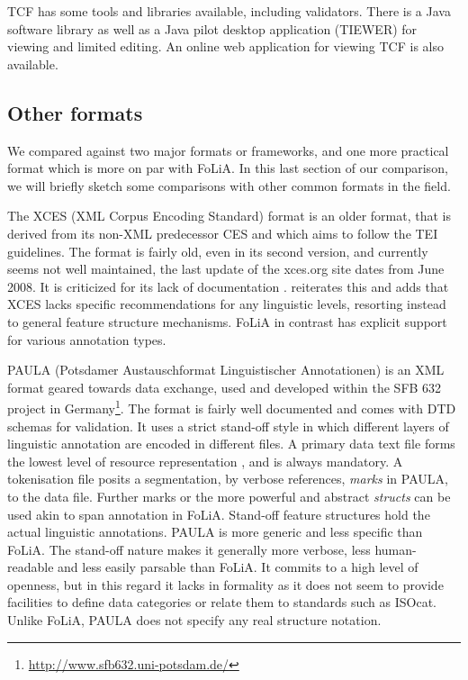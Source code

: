 \documentclass[a4paper,10pt,twoside]{article}
\begin{document}
TCF has some tools and libraries available, including validators. There is a
Java software library as well as a Java pilot desktop application (TIEWER) for
viewing and limited editing. An online web application for viewing TCF is also
available.


\subsection{Other formats}

We compared against two major formats or frameworks, and one more practical format which is
more on par with FoLiA. In this last section of our comparison, we will briefly
sketch some comparisons with other common formats in the field.

The XCES (XML Corpus Encoding Standard) format is an older format, that is
derived from its non-XML predecessor CES \cite{XCES} and which aims to follow
the TEI guidelines. The format is fairly old, even in its second version, and
currently seems not well maintained, the last update of the xces.org site dates
from June 2008. It is criticized for its lack of documentation
\cite{TEICORPUSANNOT}.   reiterates this and adds that XCES
lacks specific recommendations for any linguistic levels, resorting instead to
general feature structure mechanisms.  FoLiA in contrast has explicit support
for various annotation types.

PAULA (Potsdamer Austauschformat Linguistischer Annotationen) is an XML format
geared towards data exchange, used and developed within the SFB 632 project in
Germany\footnote{\url{http://www.sfb632.uni-potsdam.de/}}. The format is fairly well
documented and comes with DTD schemas for validation. It uses a strict
stand-off style in which different layers of linguistic annotation are encoded
in different files. A primary data text file forms the lowest level of resource
representation \cite{PAULA}, and is always mandatory. A tokenisation file
posits a segmentation, by verbose references, \emph{marks} in PAULA, to the
data file. Further marks or the more powerful and abstract \emph{structs} can
be used akin to span annotation in FoLiA.  Stand-off feature structures hold
the actual linguistic annotations. PAULA is more generic and less specific than
FoLiA. The stand-off nature makes it generally more verbose, less
human-readable and less easily parsable than FoLiA. It commits to a high level
of openness, but in this regard it lacks in formality as it does not seem to
provide facilities to define data categories or relate them to standards such
as ISOcat.  Unlike FoLiA, PAULA does not specify any real structure notation.
\end{document}
